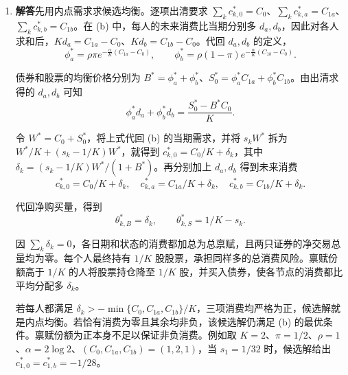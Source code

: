 \begin{solution}[blank-type=manual,blank-vsep=10\baselineskip]
\begin{enumerate}[label=(\alph*)]
 若所得三项均为正，严格凹性保证这是唯一最优消费。为处理零消费，记 $q=(1,\phi_a,\phi_b)$、$\beta=(1,\rho\pi,\rho(1-\pi))$，下标按 $0,a,b$ 排列。若 $c_{k,s}=0$，只能从零向上增加该项消费，最优时零点的边际效用 $\alpha\beta_s$ 不超过这项支出的边际效用成本 $\lambda_kq_s$。若 $c_{k,s}>0$，两者在最优消费处相等，即 $\alpha\beta_s e^{-\alpha c_{k,s}}=\lambda_kq_s$。合写为
 \[
 c_{k,s}=\max\!\left\{0,\frac1\alpha
             \log\frac{\alpha\beta_s}{\lambda_kq_s}\right\}.
 \]
 给定价格，由 $\sum_s q_sc_{k,s}=s_kW$ 确定 $\lambda_k$。

 初始持仓为 $\bar\theta_k=[0,s_k]^{\mathsf T}$。由 $X(\bar\theta_k+\theta_k)=[c_{k,a},c_{k,b}]^{\mathsf T}$，得到债券和股票的净购买量：
 \[
 \theta_{k,B}=\frac{C_{1a}c_{k,b}-C_{1b}c_{k,a}}{C_{1a}-C_{1b}},\qquad
 \theta_{k,S}=\frac{c_{k,a}-c_{k,b}}{C_{1a}-C_{1b}}-s_k.
 \]

 \item \textbf{解答}\quad 先用内点需求求候选均衡。逐项出清要求 $\sum_kc_{k,0}^*=C_0$、$\sum_kc_{k,a}^*=C_{1a}$、$\sum_kc_{k,b}^*=C_{1b}$。在 (b) 中，每人的未来消费比当期分别多 $d_a,d_b$，因此对各人求和后，$Kd_a=C_{1a}-C_0$、$Kd_b=C_{1b}-C_0$。代回 $d_a,d_b$ 的定义，
 \[
 \phi_a^*=\rho\pi e^{-\frac\alpha K(C_{1a}-C_0)},\qquad
 \phi_b^*=\rho(1-\pi)e^{-\frac\alpha K(C_{1b}-C_0)}.
 \]

 债券和股票的均衡价格分别为 $B^*=\phi_a^*+\phi_b^*$、$S_0^*=\phi_a^*C_{1a}+\phi_b^*C_{1b}$。由出清求得的 $d_a,d_b$ 可知
 \[
 \phi_a^*d_a+\phi_b^*d_b=\frac{S_0^*-B^*C_0}{K}.
 \]

 令 $W^*=C_0+S_0^*$，将上式代回 (b) 的当期需求，并将 $s_kW^*$ 拆为 $W^*/K+(s_k-1/K)W^*$，就得到 $c_{k,0}^*=C_0/K+\delta_k$，其中 $\delta_k=(s_k-1/K)W^*/(1+B^*)$。再分别加上 $d_a,d_b$ 得到未来消费
 \[
 c_{k,0}^*=C_0/K+\delta_k,\quad
 c_{k,a}^*=C_{1a}/K+\delta_k,\quad
 c_{k,b}^*=C_{1b}/K+\delta_k.
 \]

 代回净购买量，得到
 \[
 \theta_{k,B}^*=\delta_k,\qquad \theta_{k,S}^*=1/K-s_k.
 \]

 因 $\sum_k\delta_k=0$，各日期和状态的消费都加总为总禀赋，且两只证券的净交易总量均为零。每个人最终持有 $1/K$ 股股票，承担同样多的总消费风险。禀赋份额高于 $1/K$ 的人将股票持仓降至 $1/K$ 股，并买入债券，使各节点的消费都比平均分配多 $\delta_k$。

 若每人都满足 $\delta_k>-\min\{C_0,C_{1a},C_{1b}\}/K$，三项消费均严格为正，候选解就是内点均衡。若恰有消费为零且其余均非负，该候选解仍满足 (b) 的最优条件。禀赋份额为正本身不足以保证非负消费。例如取 $K=2$、$\pi=1/2$、$\rho=1$、$\alpha=2\log 2$、$(C_0,C_{1a},C_{1b})=(1,2,1)$，当 $s_1=1/32$ 时，候选解给出 $c_{1,0}^*=c_{1,b}^*=-1/28$。


\end{enumerate}
\end{solution}
